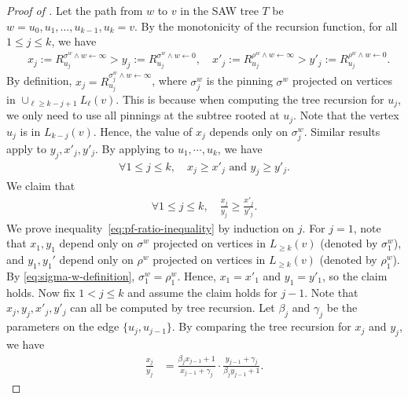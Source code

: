 \documentclass[11pt]{amsart}
\newcommand{\defeq}{:=}
\theoremstyle{definition}
\theoremstyle{remark}
\begin{document}
\begin{proof}[Proof of ]
Let the path from $w$ to $v$ in the SAW tree $T$ be $w = u_0,u_1,\ldots,u_{k-1},u_k = v$. 
By the monotonicity of the recursion function, for all $1\leq j \leq k$, we have 
\begin{align}\label{eq:pf-mono}
&x_j\defeq R_{u_j}^{\sigma^w \land w \gets \infty} > y_j \defeq R_{u_j}^{\sigma^w \land w \gets 0},\quad x'_j \defeq R_{u_j}^{\rho^w \land w \gets \infty} > y'_j \defeq R_{u_j}^{\rho^w \land w \gets 0}.
\end{align}
By definition, $x_j = R_{u_j}^{\sigma^w_j \land w \gets \infty}$, where $\sigma^w_j$ is the pinning $\sigma^w$ projected on vertices in $\cup_{\ell \geq k -j + 1}L_\ell(v)$. This is because when computing the tree recursion for $u_j$, we only need to use all pinnings at the subtree rooted at $u_j$. Note that the vertex $u_j$ is in $L_{k-j}(v)$. Hence, the value of $x_j$ depends only on $\sigma^w_j$. 
Similar results apply to $y_j,x'_j,y'_j$.
By applying  to $u_1,\cdots,u_k$, we have 
\begin{align*}
\forall 1 \leq j \leq k, \quad x_j \geq x'_j \text{ and } y_j \geq y'_j.
\end{align*}
We claim that
\begin{align}\label{eq:pf-ratio-inequality}
\forall 1 \leq j \leq k, \quad \frac{x_j}{y_j}\geq \frac{x'_j}{y'_j}.
\end{align}
We prove inequality~\eqref{eq:pf-ratio-inequality} by induction on $j$.
For $j=1$, note that $x_1,y_1$ depend only on $\sigma^w$ projected on vertices in $L_{\geq k}(v)$ (denoted by $\sigma^w_1$), and $y_1,y_1'$ depend only on $\rho^w$ projected on vertices in $L_{\geq k}(v)$ (denoted by $\rho^w_1$). By \eqref{eq:sigma-w-definition}, $\sigma^w_1 = \rho^w_1$. Hence, $x_1 = x'_1$ and $y_1 = y'_1$, so the claim holds. 
Now fix $1< j\leq k$ and assume the claim holds for $j-1$.
Note that $x_j,y_j,x'_j,y'_j$ can all be computed by tree recursion. Let $\beta_j$ and $\gamma_j$ be the parameters on the edge $\{u_j,u_{j-1}\}$. By comparing the tree recursion for $x_j$ and $y_j$, we have 
\begin{align*}
    \frac{x_j}{y_j} &= \frac{\beta_j x_{j-1} + 1}{x_{j-1} + \gamma_j} \cdot \frac{y_{j-1} + \gamma_j}{\beta_j y_{j-1} + 1}.
\end{align*}

\end{proof}
\end{document}
